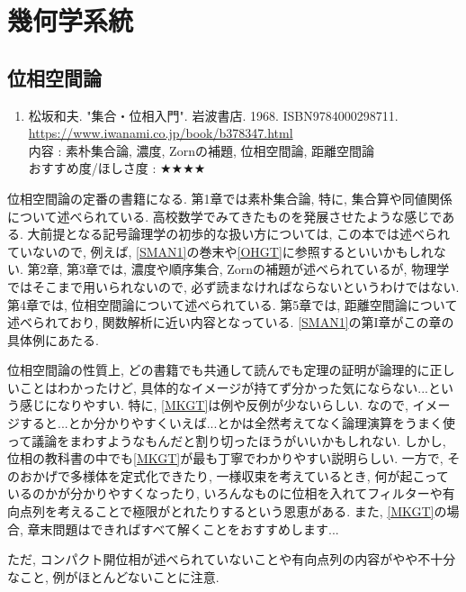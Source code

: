 \documentclass[10pt,a4paper]{jsarticle}
\begin{document}
\section{幾何学系統}
\subsection{位相空間論}
    \begin{enumerate}
        \renewcommand{\theenumi}{[GT\arabic{enumi}]}
        \renewcommand{\labelenumi}{\theenumi}
        \setcounter{enumi}{0}
        \item \label{MKGT} 松坂和夫. "集合・位相入門". 岩波書店. 1968. ISBN9784000298711. \\
        \url{https://www.iwanami.co.jp/book/b378347.html} \\
        内容 : 素朴集合論, 濃度, Zornの補題, 位相空間論, 距離空間論\\
        おすすめ度/ほしさ度 : $\bigstar \bigstar \bigstar \bigstar $
    \end{enumerate}\par
    位相空間論の定番の書籍になる. 第1章では素朴集合論, 特に, 集合算や同値関係について述べられている. 高校数学でみてきたものを発展させたような感じである. 大前提となる記号論理学の初歩的な扱い方については, この本では述べられていないので, 例えば, \ref{SMAN1}の巻末や\ref{OHGT}に参照するといいかもしれない. 第2章, 第3章では, 濃度や順序集合, Zornの補題が述べられているが, 物理学ではそこまで用いられないので, 必ず読まなければならないというわけではない. 第4章では, 位相空間論について述べられている. 第5章では, 距離空間論について述べられており, 関数解析に近い内容となっている. \ref{SMAN1}の第I章がこの章の具体例にあたる. \par
    位相空間論の性質上, どの書籍でも共通して読んでも定理の証明が論理的に正しいことはわかったけど, 具体的なイメージが持てず分かった気にならない...という感じになりやすい. 特に, \ref{MKGT}は例や反例が少ないらしい. なので, イメージすると...とか分かりやすくいえば...とかは全然考えてなく論理演算をうまく使って議論をまわすようなもんだと割り切ったほうがいいかもしれない. しかし, 位相の教科書の中でも\ref{MKGT}が最も丁寧でわかりやすい説明らしい. 一方で, そのおかげで多様体を定式化できたり, 一様収束を考えているとき, 何が起こっているのかが分かりやすくなったり, いろんなものに位相を入れてフィルターや有向点列を考えることで極限がとれたりするという恩恵がある. また, \ref{MKGT}の場合, 章末問題はできればすべて解くことをおすすめします... \par
    ただ, コンパクト開位相が述べられていないことや有向点列の内容がやや不十分なこと, 例がほとんどないことに注意. 
\end{document}
